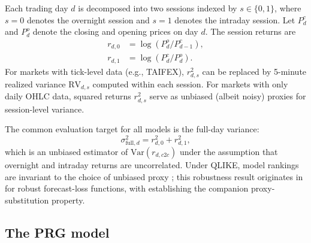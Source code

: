 \documentclass[11pt,a4paper]{article}
\begin{document}
Each trading day $d$ is decomposed into two sessions indexed by $s \in \{0, 1\}$, where $s = 0$ denotes the overnight session and $s = 1$ denotes the intraday session. Let $P^{c}_d$ and $P^{o}_d$ denote the closing and opening prices on day $d$. The session returns are
\begin{align}
    r_{d,0} &= \log(P^{o}_d / P^{c}_{d-1}), \label{eq:r_overnight} \\
    r_{d,1} &= \log(P^{c}_d / P^{o}_d). \label{eq:r_intraday}
\end{align}
For markets with tick-level data (e.g., TAIFEX), $r^2_{d,s}$ can be replaced by 5-minute realized variance $\text{RV}_{d,s}$ computed within each session. For markets with only daily OHLC data, squared returns $r^2_{d,s}$ serve as unbiased (albeit noisy) proxies for session-level variance.

The common evaluation target for all models is the full-day variance:
\begin{equation}
    \sigma^2_{\text{full},d} = r^2_{d,0} + r^2_{d,1},
    \label{eq:target}
\end{equation}
which is an unbiased estimator of $\text{Var}(r_{d,c2c})$ under the assumption that overnight and intraday returns are uncorrelated. Under QLIKE, model rankings are invariant to the choice of unbiased proxy \citep{Patton2011, Hansen2005}; this robustness result originates in \citet{Patton2011} for robust forecast-loss functions, with \citet{Hansen2005} establishing the companion proxy-substitution property.

\subsection{The PRG model}
\end{document}
